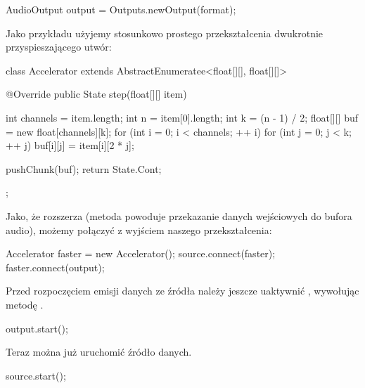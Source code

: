 \begin{java}
AudioOutput output = Outputs.newOutput(format);
\end{java}

Jako przykładu użyjemy stosunkowo prostego przekształcenia dwukrotnie przyspieszającego utwór:

\begin{java}
class Accelerator extends AbstractEnumeratee<float[][], float[][]> {

    @Override
    public State step(float[][] item) {
        int channels = item.length;
        int n = item[0].length;
        int k = (n - 1) / 2;
        float[][] buf = new float[channels][k];
        for (int i = 0; i < channels; ++ i) {
            for (int j = 0; j < k; ++ j) {
                buf[i][j] = item[i][2 * j];
            }
        }

        pushChunk(buf);
        return State.Cont;
    }
};
\end{java}

Jako, że  rozszerza  (metoda  powoduje
przekazanie danych wejściowych do bufora audio), możemy połączyć  z wyjściem naszego
przekształcenia:

\begin{java}
Accelerator faster = new Accelerator();
source.connect(faster);
faster.connect(output);
\end{java}

Przed rozpoczęciem emisji danych ze źródła należy jeszcze uaktywnić , wywołując
metodę .

\begin{java}
output.start();
\end{java}

Teraz można już uruchomić źródło danych.

\begin{java}
source.start();
\end{java}

